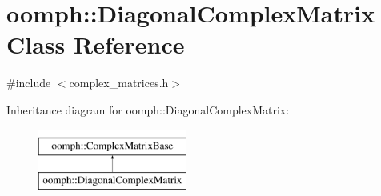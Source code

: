 \hypertarget{classoomph_1_1DiagonalComplexMatrix}{}\section{oomph\+:\+:Diagonal\+Complex\+Matrix Class Reference}
\label{classoomph_1_1DiagonalComplexMatrix}


{\ttfamily \#include $<$complex\+\_\+matrices.\+h$>$}

Inheritance diagram for oomph\+:\+:Diagonal\+Complex\+Matrix\+:\begin{figure}[H]
\begin{center}
\leavevmode
\includegraphics[height=2.000000cm]{classoomph_1_1DiagonalComplexMatrix}
\end{center}
\end{figure}
